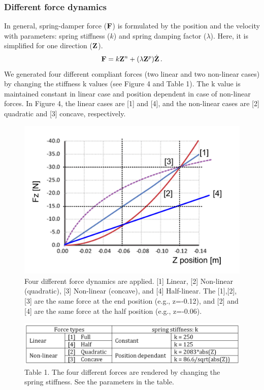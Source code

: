 \subsubsection{Different force dynamics}
In general, spring-damper force ($\mathbf{F}$) is formulated by the position and the
velocity with parameters: spring stiffness ($k$) and spring damping factor
($\lambda$).  Here, it is simplified for one direction ($\mathbf{Z}$).
%
\begin{equation}
\mathbf{F} = k \mathbf{Z}^n + (\lambda \mathbf{Z}^p) \dot{\mathbf{Z}} \, .
\end{equation}
%
We generated four different compliant forces (two linear and two non-linear cases) by changing the stiffness k values (see Figure 4 and Table 1). The k value is maintained constant in linear case and position dependent in case of non-linear forces. In Figure 4, the linear cases are [1] and [4], and the non-linear cases are [2] quadratic and [3] concave, respectively.
\begin{figure}
	\centering
	\includegraphics[width=.7\textwidth]{Chie/figs/Figure4.png}
	\caption{Four different force dynamics are applied. [1] Linear, [2] Non-linear (quadratic), [3] Non-linear (concave), and [4] Half-linear. The [1],[2],[3] are the same force at the end position (e.g., z=-0.12), and [2] and [4] are the same force at the half position  (e.g., z=-0.06).}
	\label{forcedyn}
\end{figure}

\begin{figure}
	\centering
	\includegraphics[width=.7\textwidth]{Chie/figs/Table1.png}
	\caption{Table 1. The four different forces are rendered by changing the spring stiffness. See the parameters in the table.}
	\label{Table1}
\end{figure}

